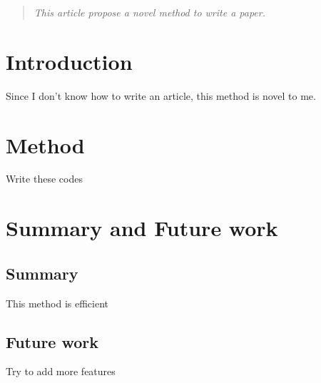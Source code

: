 \documentclass[10pt]{article}
\begin{document}
\begin{abstract}
\textit{This article propose a novel method to write a paper.}
\end{abstract}

\section{Introduction}
Since I don't know how to write an article, this method is novel to me.\cite{DBLP:journals/corr/RajpurkarMKCTWN15}

\section{Method}
Write these codes

\section{Summary and Future work}
\subsection{Summary}
This method is efficient
\subsection{Future work}
Try to add more features


\medskip
\medskip
\nocite{*}


\end{document}
